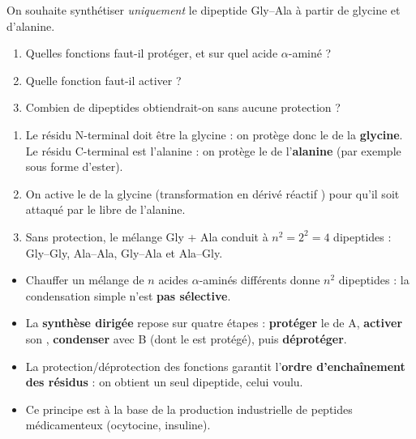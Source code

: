 \documentclass[11pt]{article}
\begin{document}
\begin{exercice}
On souhaite synthétiser \emph{uniquement} le dipeptide Gly--Ala à partir de glycine et d'alanine.
\begin{enumerate}
\item Quelles fonctions faut-il protéger, et sur quel acide $\alpha$-aminé ?
\item Quelle fonction faut-il activer ?
\item Combien de dipeptides obtiendrait-on sans aucune protection ?
\end{enumerate}
\end{exercice}

\begin{corrige}[Exercice 1]
\begin{enumerate}
\item Le résidu N-terminal doit être la glycine : on protège donc le  de la \textbf{glycine}. Le résidu C-terminal est l'alanine : on protège le  de l'\textbf{alanine} (par exemple sous forme d'ester).
\item On active le  de la glycine (transformation en dérivé réactif ) pour qu'il soit attaqué par le  libre de l'alanine.
\item Sans protection, le mélange Gly + Ala conduit à $n^2 = 2^2 = 4$ dipeptides : Gly--Gly, Ala--Ala, Gly--Ala et Ala--Gly.
\end{enumerate}
\end{corrige}

\begin{aretenir}
\begin{itemize}
\item Chauffer un mélange de $n$ acides $\alpha$-aminés différents donne $n^2$ dipeptides : la condensation simple n'est \textbf{pas sélective}.
\item La \textbf{synthèse dirigée} repose sur quatre étapes : \textbf{protéger} le  de A, \textbf{activer} son , \textbf{condenser} avec B (dont le  est protégé), puis \textbf{déprotéger}.
\item La protection/déprotection des fonctions garantit l'\textbf{ordre d'enchaînement des résidus} : on obtient un seul dipeptide, celui voulu.
\item Ce principe est à la base de la production industrielle de peptides médicamenteux (ocytocine, insuline).
\end{itemize}
\end{aretenir}
\end{document}
